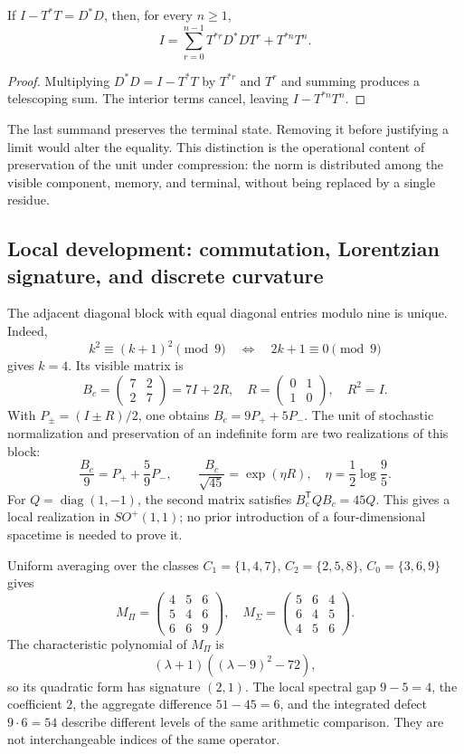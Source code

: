 \begin{proposition}
If \(I-T^*T=D^*D\), then, for every \(n\ge1\),
\begin{equation}
 I=\sum_{r=0}^{n-1}T^{*r}D^*DT^r+T^{*n}T^n.
 \label{eq:telescopia}
\end{equation}
\end{proposition}
\begin{proof}
Multiplying \(D^*D=I-T^*T\) by \(T^{*r}\) and \(T^r\) and summing produces a telescoping sum. The interior terms cancel, leaving \(I-T^{*n}T^n\).
\end{proof}

The last summand preserves the terminal state. Removing it before justifying a limit would alter the equality. This distinction is the operational content of preservation of the unit under compression: the norm is distributed among the visible component, memory, and terminal, without being replaced by a single residue.

\subsection{Local development: commutation, Lorentzian signature, and discrete curvature}

The adjacent diagonal block with equal diagonal entries modulo nine is unique. Indeed,
\[
 k^2\equiv(k+1)^2\pmod9\quad\Longleftrightarrow\quad2k+1\equiv0\pmod9
\]
gives \(k=4\). Its visible matrix is
\[
 B_c=\begin{pmatrix}7&2\\2&7\end{pmatrix}=7I+2R,
 \quad R=\begin{pmatrix}0&1\\1&0\end{pmatrix},\quad R^2=I.
\]
With \(P_\pm=(I\pm R)/2\), one obtains \(B_c=9P_++5P_-\). The unit of stochastic normalization and preservation of an indefinite form are two realizations of this block:
\[
 \frac{B_c}{9}=P_++\frac59P_-,\qquad
 \frac{B_c}{\sqrt{45}}=\exp(\eta R),\quad\eta=\frac12\log\frac95.
\]
For \(Q=\operatorname{diag}(1,-1)\), the second matrix satisfies \(B_c^{\mathsf T}QB_c=45Q\). This gives a local realization in \(SO^+(1,1)\); no prior introduction of a four-dimensional spacetime is needed to prove it.

Uniform averaging over the classes \(C_1=\{1,4,7\}\), \(C_2=\{2,5,8\}\), \(C_0=\{3,6,9\}\) gives
\[
 M_\Pi=\begin{pmatrix}4&5&6\\5&4&6\\6&6&9\end{pmatrix},\quad
 M_\Sigma=\begin{pmatrix}5&6&4\\6&4&5\\4&5&6\end{pmatrix}.
\]
The characteristic polynomial of \(M_\Pi\) is
\[
 (\lambda+1)((\lambda-9)^2-72),
\]
so its quadratic form has signature \((2,1)\). The local spectral gap \(9-5=4\), the coefficient \(2\), the aggregate difference \(51-45=6\), and the integrated defect \(9\cdot6=54\) describe different levels of the same arithmetic comparison. They are not interchangeable indices of the same operator.

